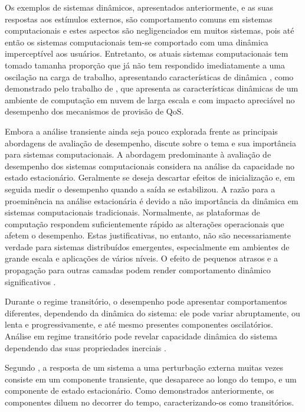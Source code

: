 Os exemplos de sistemas dinâmicos, apresentados anteriormente, e as suas respostas aos estímulos externos, são comportamento comuns em sistemas computacionais e estes aspectos são negligenciados em muitos sistemas, pois até então os sistemas computacionais tem-se comportado com uma dinâmica imperceptível aos usuários. Entretanto, os atuais sistemas computacionais tem tomado tamanha proporção que já não tem respondido imediatamente a uma oscilação na carga de trabalho, apresentando características de dinâmica \cite{Janert2013}, como demonstrado pelo trabalho de , que apresenta as características dinâmicas de um ambiente de computação em nuvem de larga escala e com impacto apreciável no desempenho dos mecanismos de provisão de QoS.


Embora a análise transiente ainda seja pouco explorada frente as principais abordagens de avaliação de desempenho,  discute sobre o tema e sua importância para sistemas computacionais. A abordagem predominante à avaliação de desempenho dos sistemas computacionais considera na análise da capacidade no estado estacionário. Geralmente se deseja descartar efeitos de inicialização e, em seguida medir o desempenho quando a saída se estabilizou. A razão para a proeminência na análise estacionária é devido a não importância da dinâmica em sistemas computacionais tradicionais. Normalmente, as plataformas de computação respondem suficientemente rápido as alterações operacionais que afetem o desempenho. Estas justificativas, no entanto, não são necessariamente verdade para sistemas distribuídos emergentes, especialmente em ambientes de grande escala e aplicações de vários níveis. O efeito de pequenos atrasos e a propagação para outras camadas podem render comportamento dinâmico significativos \cite{Lourenco2015}.

Durante o regime transitório, o desempenho pode apresentar comportamentos diferentes, dependendo da dinâmica do sistema: ele pode variar abruptamente, ou lenta e progressivamente, e até mesmo presentes componentes oscilatórios. Análise em regime transitório pode revelar capacidade dinâmica do sistema dependendo das suas propriedades inerciais \cite{Lourenco2015}.

Segundo , a resposta de um sistema a uma perturbação externa muitas vezes consiste em um componente transiente, que desaparece ao longo do tempo, e um componente de estado estacionário. Como demonstrados anteriormente, os componentes diluem no decorrer do tempo, caracterizando-os como transitórios. 

